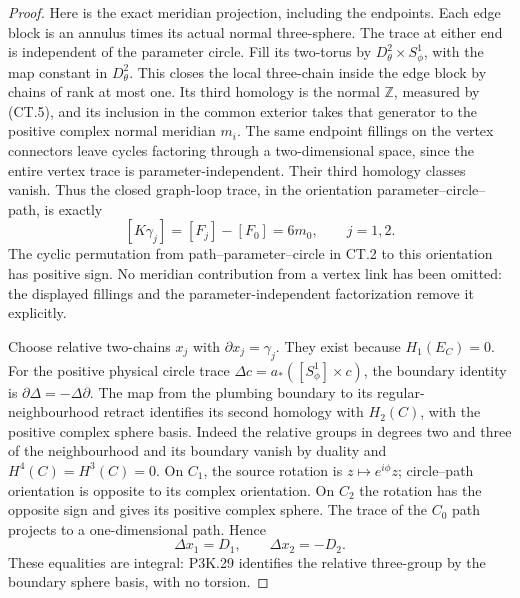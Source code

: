 \begin{proof}
Here is the exact meridian projection, including the endpoints.
Each edge block is an annulus times its actual normal three-sphere.
The trace at either end is independent of the parameter circle.
Fill its two-torus by \(D^2_\theta\times S^1_\phi\), with the map
constant in \(D^2_\theta\). This closes the local three-chain
inside the edge block by chains of rank at most one. Its third
homology is the normal \(\mathbb Z\), measured by (CT.5), and its
inclusion in the common exterior takes that generator to the
positive complex normal meridian \(m_i\). The same endpoint
fillings on the vertex connectors leave cycles factoring through
a two-dimensional space, since the entire vertex trace is
parameter-independent. Their third homology classes vanish.
Thus the closed graph-loop trace, in the orientation
parameter--circle--path, is exactly
\[
 [K\gamma_j]=[F_j]-[F_0]=6m_0,\qquad j=1,2.       \tag{CT.6}
\]
The cyclic permutation from path--parameter--circle in CT.2 to this
orientation has positive sign. No meridian contribution from a
vertex link has been omitted: the displayed fillings and the
parameter-independent factorization remove it explicitly.

Choose relative two-chains \(x_j\) with \(\partial x_j=\gamma_j\).
They exist because \(H_1(E_C)=0\). For the positive physical circle
trace \(\Delta c=a_*([S^1_\phi]\times c)\), the boundary identity
is \(\partial\Delta=-\Delta\partial\). The map from the plumbing
boundary to its regular-neighbourhood retract identifies its second
homology with \(H_2(C)\), with the positive complex sphere basis.
Indeed the relative groups in degrees two and three of the
neighbourhood and its boundary vanish by duality and
\(H^4(C)=H^3(C)=0\). On \(C_1\), the source rotation is
\(z\mapsto e^{i\phi}z\); circle--path orientation is opposite to
its complex orientation. On \(C_2\) the rotation has the opposite
sign and gives its positive complex sphere. The trace of the
\(C_0\) path projects to a one-dimensional path. Hence
\[
             \Delta x_1=D_1,\qquad
             \Delta x_2=-D_2.                         \tag{CT.7}
\]
These equalities are integral: P3K.29 identifies the relative
three-group by the boundary sphere basis, with no torsion.


\end{proof}
